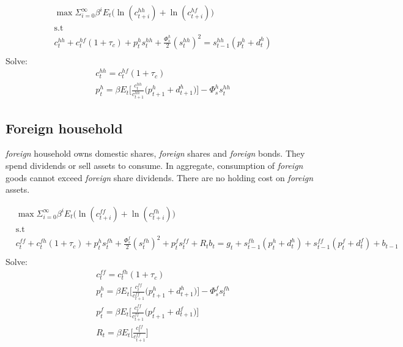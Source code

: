 \documentclass[a4paper]{article}
\begin{document}
\begin{align*}
&\max \Sigma_{i=0}^\infty \beta^i E_t \bigg(\ln(c^{hh}_{t+i})+ \ln(c^{hf}_{t+i}) \bigg)\\ &\text{s.t}\\
&c^{hh}_t+c^{hf}_t(1+\tau_c)+ p^{h}_t s^{hh}_t+\frac{\Phi^h_s}{2}(s^{hh}_t)^2 =s^{hh}_{t-1}(p^{h}_t+d^{h}_t)\\
\end{align*}
Solve:
\begin{align}
&c^{hh}_t=c^{hf}_t(1+\tau_c)\\
&p^{h}_t=\beta E_t \bigg[\frac{c^{hh}_t}{c^{hh}_{t+1}} \bigg(  p^{h}_{t+1}+d^{h}_{t+1} \bigg) \bigg] - \Phi^h_s s^{hh}_t
\end{align}




















\subsection{Foreign household}
\emph{foreign} household owns domestic shares, \emph{foreign} shares and \emph{foreign} bonds. They spend dividends or sell assets to consume. In aggregate, consumption of \emph{foreign} goods cannot exceed \emph{foreign} share dividends. There are no holding cost on \emph{foreign} assets. 

\begin{align*}
&\max \Sigma_{i=0}^\infty \beta^i E_t \bigg(\ln(c^{ff}_{t+i})+ \ln(c^{fh}_{t+i}) \bigg)\\ &\text{s.t}\\
&c^{ff}_t+c^{fh}_t(1+\tau_c)+ p^{h}_t s^{fh}_t+\frac{\Phi^f_s}{2}(s^{fh}_t)^2 + p^{f}_t s^{ff}_t+ R_t b_t=g_t+s^{fh}_{t-1}(p^{h}_t+d^{h}_t)+s^{ff}_{t-1}(p^{f}_t+d^{f}_t)+b_{t-1}\\
\end{align*}
Solve:
\begin{align}
&c^{ff}_t=c^{fh}_t(1+\tau_c)\\
&p^{h}_t=\beta E_t \bigg[\frac{c^{ff}_t}{c^{ff}_{t+1}} \bigg(  p^{h}_{t+1}+d^{h}_{t+1} \bigg) \bigg] - \Phi^{f}_s s^{fh}_t\\
&p^{f}_t=\beta E_t \bigg[\frac{c^{ff}_t}{c^{ff}_{t+1}} \bigg(  p^{f}_{t+1}+d^{f}_{t+1} \bigg) \bigg]\\
&R_t=\beta E_t \bigg[\frac{c^{ff}_t}{c^{ff}_{t+1}} \bigg] 
\end{align}
\end{document}
